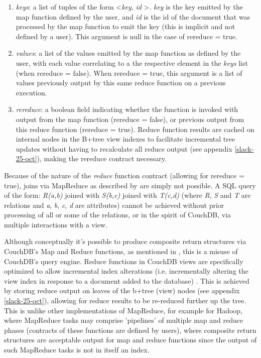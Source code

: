\begin{enumerate}
    \item \textit{keys}: a list of tuples of the form \textless \textit{key}, \textit{id} \textgreater. \textit{key} is the key emitted by the map function defined by the user, and \textit{id} is the id of the document that was processed by the map function to emit the key (this is implicit and not defined by a user). This argument is null in the case of rereduce = true.
    \item \textit{values}: a list of the values emitted by the map function as defined by the user, with each value correlating to a the respective element in the \textit{keys} list (when rereduce = false). When rereduce = true, this argument is a list of values previously output by this same reduce function on a previous execution.
    \item \textit{rereduce}: a boolean field indicating whether the function is invoked with output from the map function (rereduce = false), or previous output from this reduce function (rereduce = true). Reduce function results are cached on internal nodes in the B+tree view indexes to facilitate incremental tree updates without having to recalculate all reduce output (see appendix \ref{slack-25-oct}), making the rereduce contract necessary.
\end{enumerate}

Because of the nature of the \textit{reduce} function contract (allowing for rereduce = true), joins via MapReduce as described by \cite{chandar2010} are simply not possible. A SQL query of the form: \textit{R(a,b)} joined with \textit{S(b,c)} joined with \textit{T(c,d)} (where \textit{R}, \textit{S} and \textit{T} are relations and \textit{a}, \textit{b}, \textit{c}, \textit{d} are attributes) cannot be achieved without prior processing of all or some of the relations, or in the spirit of CouchDB, via multiple interactions with a view.

Although conceptually it's possible to produce composite return structures via CouchDB's Map and Reduce functions, as mentioned in \cite{reduceFunctions}, this is a misuse of CouchDB's query engine. Reduce functions in CouchDB views are specifically optimized to allow incremental index alterations (i.e. incrementally altering the view index in response to a document added to the database) \cite{reduceFunctions}. This is achieved by storing reduce output on leaves of the b+tree (view) nodes (see appendix \ref{slack-25-oct}), allowing for reduce results to be re-reduced further up the tree. This is unlike other implementations of MapReduce, for example for Hadoop, where MapReduce tasks may comprise 'pipelines' of multiple map and reduce phases (contracts of these functions are defined by users), where composite return structures are acceptable output for map and reduce functions since the output of such MapReduce tasks is not in itself an index.

